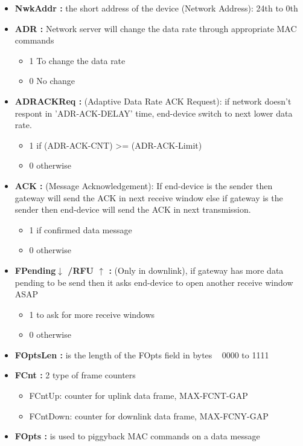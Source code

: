 \begin{landscape}
\begin{multicols}{2}
\begin{itemize}
	\item \textbf{NwkAddr :} the short address of the device (Network Address): 24th to 0th
	\item \textbf{ADR :}  Network server will change the data rate through appropriate MAC commands
	\begin{itemize}
		\item 1  To change the data rate
		\item 0  No change
	\end{itemize}
	\item \textbf{ADRACKReq :} (Adaptive Data Rate ACK Request): if network doesn't respont in 'ADR-ACK-DELAY' time, end-device switch to next lower data rate.
	\begin{itemize}
		\item 1  if (ADR-ACK-CNT) >= (ADR-ACK-Limit)
		\item 0  otherwise
	\end{itemize}
	\item \textbf{ACK :} (Message Acknowledgement): If end-device is the sender then gateway will send the ACK in next receive window  else if gateway is the sender then end-device will send the ACK in next transmission.
	\begin{itemize}
		\item 1  if confirmed data message
		\item 0  otherwise
	\end{itemize}
	\item \textbf{FPending$\downarrow$ /RFU $\uparrow$ :} (Only in downlink), if gateway has more data pending to be send then it asks end-device to open another receive window ASAP
	\begin{itemize}
		\item 1  to ask for more receive windows
		\item 0  otherwise
	\end{itemize}
	\item \textbf{FOptsLen :} is the length of the FOpts field in bytes   0000 to 1111 
	\item \textbf{FCnt :}  2 type of frame counters 
	\begin{itemize}
		\item FCntUp:  counter for uplink data frame, MAX-FCNT-GAP
		\item FCntDown:  counter for downlink data frame, MAX-FCNY-GAP
	\end{itemize}  
	\item \textbf{FOpts :} is used to piggyback MAC commands on a data message	

\end{itemize}
\end{multicols}
\end{landscape}
